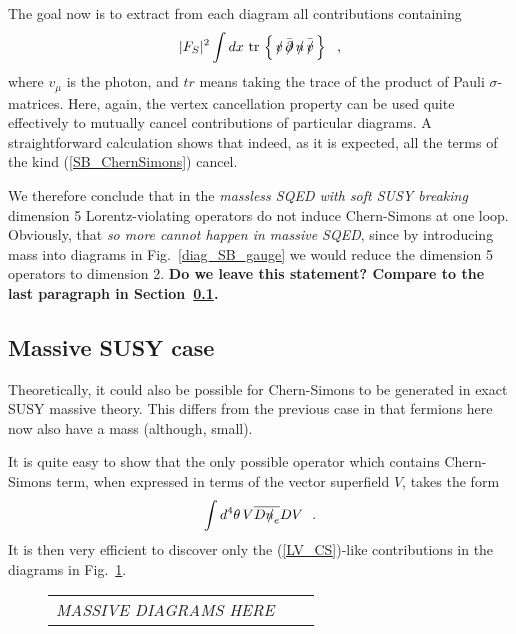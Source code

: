 \documentclass[a4paper,12pt]{article}
\newcommand{\slashed}[1]{\hbox{{$#1$}\llap{$/$}}}
\begin{document}
	The goal now is to extract from each diagram all 
	contributions containing
\begin{equation}
\label{SB_ChernSimons}
	|F_S|^2 \int dx ~ \mathrm{tr} \,\left\{\, 
	      \slashed{v} \, \bar{\slashed{\partial}} \,
	      \slashed{n} \, \bar{\slashed{v}} \,
                              \right\}
	~~,
\end{equation}
	where $ v_\mu $ is the photon, and $ tr $ means
	taking the trace of the product of Pauli 
	$ \sigma $-matrices.
	Here, again, the vertex cancellation property
	can be used quite effectively to mutually cancel 
	contributions of particular diagrams.
	A straightforward calculation shows that indeed,
	as it is expected, all the terms of the kind 
	(\ref{SB_ChernSimons}) cancel.

	We therefore conclude that in the 
	{\it massless SQED with soft SUSY breaking}
	dimension 5 Lorentz-violating operators do not
	induce Chern-Simons at one loop. 
	Obviously, that 
	{\it so more cannot happen in massive SQED},
	since by introducing mass into diagrams in 
Fig.~\ref{diag_SB_gauge}
	we would reduce
	the dimension 5 operators to dimension 2.
	{\bf Do we leave this statement? Compare to the
	  last paragraph in Section~\ref{Massive_SUSY}.}


\subsection{Massive SUSY case}
\label{Massive_SUSY}

	Theoretically, it could also be possible for
	Chern-Simons to be generated in exact SUSY 
	massive theory. 
	This differs from the previous case in that
	fermions here now also have a mass (although, small).

        It is quite easy to show that the only possible operator 
	which contains Chern-Simons term, when expressed in terms
	of the vector superfield $ V $, takes the form
\begin{equation}
\label{LV_CS}
	\int d^4\theta \, V \overline{D\slashed{n}_e}D V~~.
\end{equation}
        It is then very efficient to discover only the (\ref{LV_CS})-like
	contributions in the diagrams in 
Fig.~\ref{diag_gauge_massive}.

\begin{figure}[h]
 \caption{\label{diag_gauge_massive}}
\begin{center}
\begin{tabular}{ccc}
	\emph{MASSIVE DIAGRAMS HERE}
\end{tabular}
\end{center}
\end{figure}
	
\end{document}
